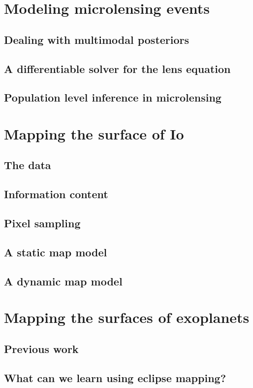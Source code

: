 \documentclass[]{report}
\begin{document}
\chapter{Modeling microlensing events}
\section{Dealing with multimodal posteriors}
\section{A differentiable solver for the lens equation}
\section{Population level inference in microlensing}

\chapter{Mapping the surface of Io}
\section{The data}
\section{Information content}
\section{Pixel sampling}
\section{A static map model}
\section{A dynamic map model}

\chapter{Mapping the surfaces of exoplanets}
\section{Previous work}
\section{What can we learn using eclipse mapping?}
\end{document}
